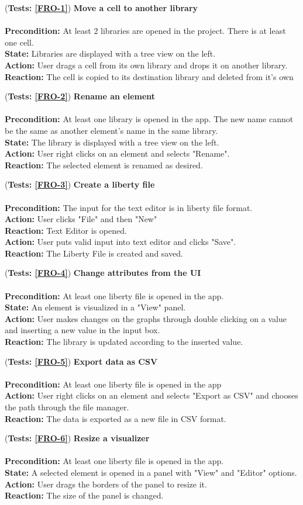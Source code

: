 \documentclass[10pt,a4paper]{report}
\newcommand{\precondition}[1]{
    \textbf{Precondition: } #1 \leavevmode \\
}
\newcommand{\action}[1]{
    \textbf{Action: } #1 \leavevmode \\
}
\newcommand{\state}[1]{
    \textbf{State: } #1 \leavevmode \\
}
\newcommand{\reaction}[1]{
    \textbf{Reaction: } #1 \leavevmode \\
}
\newcommand{\GTCODescription}[2]{
    (\textbf{Tests: #1}) \textbf{#2} \leavevmode \\
}
\begin{document}
\begin{GTCO}
    \item \GTCODescription{\ref{FRO-1}}{Move a cell to another library} \leavevmode \\ 
    \precondition{At least 2 libraries are opened in the project. There is at least one cell.}\state{Libraries are displayed with a tree view on the left.}
    \action{User drags a cell from its own library and drops it on another library.}
    \reaction{The cell is copied to its destination library and deleted from it's own}
    
    \item \GTCODescription{\ref{FRO-2}}{Rename an element} \leavevmode \\ \precondition{At least one library is opened in the app. The new name cannot be the same as another element's name in the same library.}\state{The library is displayed with a tree view on the left.}\action{User right clicks on an element and selects "Rename".}\reaction{The selected element is renamed as desired.}
    
    \item \GTCODescription{\ref{FRO-3}}{Create a liberty file} \leavevmode \\ \precondition{The input for the text editor is in liberty file format.}\action{User clicks "File" and then "New"}\reaction{Text Editor is opened.}\action{User puts valid input into text editor and clicks "Save".}\reaction{The Liberty File is created and saved.}
    
    \item \GTCODescription{\ref{FRO-4}}{Change attributes from the UI} \leavevmode \\ \precondition{At least one liberty file is opened in the app.}\state{An element is visualized in a "View" panel.}\action{User makes changes on the graphs through double clicking on a value and inserting a new value in the input box.}\reaction{The library is updated according to the inserted value.}
    
    \item \GTCODescription{\ref{FRO-5}}{Export data as CSV} \leavevmode \\ \precondition{At least one liberty file is opened in the app}\action{User right clicks on an element and selects "Export as CSV" and chooses the path through the file manager.}\reaction{The data is exported as a new file in CSV format.}
    
    
    \item \GTCODescription{\ref{FRO-6}}{Resize a visualizer} \leavevmode \\ \precondition{At least one liberty file is opened in the app.}\state{A selected element is opened in a panel with "View" and "Editor" options.}\action{User drags the borders of the panel to resize it.}\reaction{The size of the panel is changed.}
    

\end{GTCO}
\end{document}
